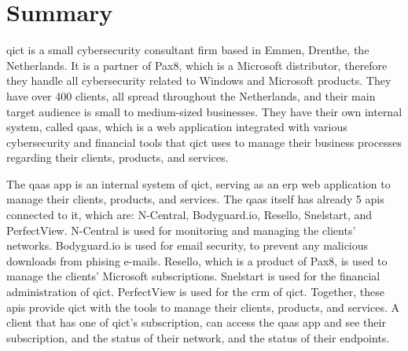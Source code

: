 \chapter*{Summary}


\acrshort{qict} is a small cybersecurity consultant firm based in Emmen, Drenthe, the Netherlands. It is a partner of Pax8,
which is a Microsoft distributor, therefore they handle all cybersecurity related to Windows and Microsoft products. They
have over 400 clients, all spread throughout the Netherlands, and their main target audience is small to medium-sized
businesses. They have their own internal system, called \acrshort{qaas}, which is a web application integrated with
various cybersecurity and financial tools that \acrshort{qict} uses to manage their business processes regarding their
clients, products, and services.

The \acrshort{qaas} app is an internal system of \acrshort{qict}, serving as an \acrshort{erp} web application to manage
their clients, products, and services. The \acrshort{qaas} itself has already 5 \acrshort{api}s connected to it, which are:
N-Central, Bodyguard.io, Resello, Snelstart, and PerfectView. N-Central is used for monitoring and managing the clients'
networks. Bodyguard.io is used for email security, to prevent any malicious downloads from phising e-mails. Resello,
which is a product of Pax8, is used to manage the clients' Microsoft subscriptions. Snelstart is used for the financial administration
of \acrshort{qict}. PerfectView is used for the \acrshort{crm} of \acrshort{qict}. Together, these \acrshort{api}s provide
\acrshort{qict} with the tools to manage their clients, products, and services. A client that has one of \acrshort{qict}'s subscription,
can access the \acrshort{qaas} app and see their subscription, and the status of their network, and the status of their endpoints.

